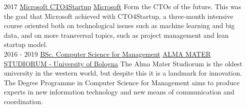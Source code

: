 \documentclass[]{friggeri-cv}
\begin{document}
\begin{entrylist}
    \entry
    {2017}
    {\href{https://www.facebook.com/CTO4Startup/}{Microsoft CTO4Startup}}
    {\href{https://www.microsoft.com}{Microsoft}}
    {Form the CTOs of the future. This was the goal that Microsoft achieved with CTO4Startup, a three-month intensive course oriented both on technological issues such as machine learning and big data, and on more transversal topics, such as project management and lean startup model.
    \\}
    \entry
    {2016 - 2019}
    {\href{http://www.unibo.it/en/teaching/degree-programmes/programme/2016/8014}{BSc. Computer Science for Management}}
    {\href{http://www.unibo.it/en/homepage}{ALMA MATER STUDIORUM - University of Bologna}}
    {The Alma Mater Studiorum is the oldest university in the western world, but despite this it is a landmark for innovation. The Degree Programme in Computer Science for Management aims to produce experts in new information technology and new means of communication and coordination. \\}
   
    
    \end{entrylist}
    
    \newpage
    
    
\end{document}
